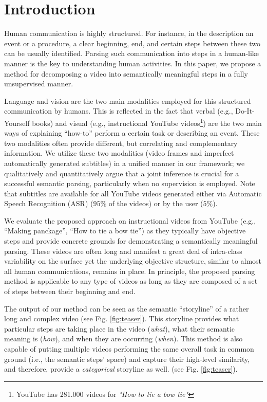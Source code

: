 \section{Introduction}

Human communication is highly structured. For instance, in the description an event or a procedure, a clear beginning, end, and certain steps between these two can be usually identified. Parsing such communication into steps in a human-like manner is the key to understanding human activities. In this paper, we propose a method for decomposing a video into semantically meaningful steps in a fully unsupervised manner.
 
Language and vision are the two main modalities employed for this structured communication by humans. This is reflected in the fact that verbal (e.g., Do-It-Yourself books) and visual (e.g., instructional YouTube videos\footnote{YouTube has 281.000 videos for \emph{"How to tie a bow tie"}}) are the two main ways of explaining ``how-to'' perform a certain task or describing an event.  These two modalities often provide different, but correlating and complementary information. We utilize these two modalities (video frames and imperfect automatically generated subtitles) in a unified manner in our framework; we qualitatively and quantitatively argue that a joint inference is crucial for a successful semantic parsing, particularly when no supervision is employed. Note that subtitles are available for all YouTube videos generated either via Automatic Speech Recognition (ASR) ($95\%$ of the videos) or by the user ($5\%$).

We evaluate the proposed approach on instructional videos from YouTube (e.g., ``Making panckage'', ``How to tie a bow tie'') as they typically have objective steps and provide concrete grounds for demonstrating a semantically meaningful parsing. These videos are often long and manifest a great deal of intra-class variability on the surface yet the underlying objective structure, similar to almost all human communications, remains in place. In principle, the proposed parsing method is applicable to any type of videos as long as they are composed of a set of steps between their beginning and end.

The output of our method can be seen as the semantic ``storyline'' of a rather long and complex video (see Fig. \ref{fig:teaser}). This storyline provides what particular steps are taking place in the video (\emph{what}), what their semantic meaning is (\emph{how}), and when they are occurring (\emph{when}). This method is also capable of putting multiple videos performing the same overall task in common ground (i.e., the semantic steps’ space) and capture their high-level similarity, and therefore, provide a \emph{categorical} storyline as well. (see Fig. \ref{fig:teaser}). 

